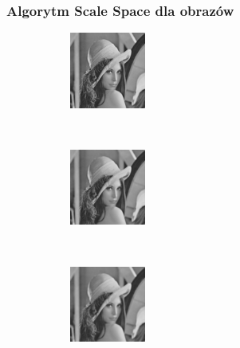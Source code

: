 \begin{frame}
	\frametitle{Algorytm Scale Space dla obrazów}


	\begin{figure}[h]
		\begin{center}
			\begin{subfigure}[b]{2.5cm}
				\centering
				\includegraphics[width=2.5cm]{Lena_scales1.jpg}
			\end{subfigure}%
			~
			\begin{subfigure}[b]{2.5cm}
				\centering
				\includegraphics[width=2.5cm]{Lena_scales2.jpg}
			\end{subfigure}%
			~
			\begin{subfigure}[b]{2.5cm}
				\centering
				\includegraphics[width=2.5cm]{Lena_scales3.jpg}
			\end{subfigure}%



\end{center}
\end{figure}
\end{frame}
